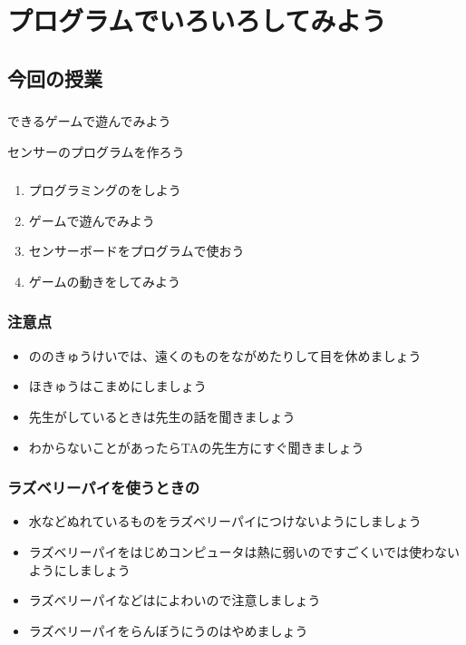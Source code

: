 \chapter{プログラムでいろいろしてみよう}
\section{今回の授業}
\subsection{}
できるゲームで遊んでみよう

センサーのプログラムを作ろう

\subsection{}
\begin{enumerate}
    \item プログラミングのをしよう
    \item {}ゲームで遊んでみよう
    \item センサーボードをプログラムで使おう
    \item ゲームの動きをしてみよう
\end{enumerate}

\subsection{注意点}
\begin{itemize}
    \item {}ののきゅうけいでは、遠くのものをながめたりして目を休めましょう
    \item {}ほきゅうはこまめにしましょう
    \item 先生がしているときは先生の話を聞きましょう
    \item わからないことがあったらTAの先生方にすぐ聞きましょう
\end{itemize}

\subsection{ラズベリーパイを使うときの}
\begin{itemize}
  \item 水などぬれているものをラズベリーパイにつけないようにしましょう
  \item ラズベリーパイをはじめコンピュータは熱に弱いのですごくいでは使わないようにしましょう
  \item ラズベリーパイなどはによわいので注意しましょう
  \item ラズベリーパイをらんぼうにうのはやめましょう
\end{itemize}
\clearpage

